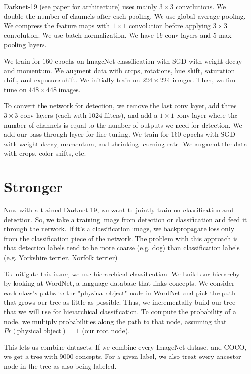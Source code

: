 \documentclass[a4paper]{article}
\begin{document}
Darknet-19 (see paper for architecture) uses mainly $3 \times 3$ convolutions.
We double the number of channels after each pooling. We use global average
pooling. We compress the feature maps with $1 \times 1$ convolution before
applying $3 \times 3$ convolution. We use batch normalization. We have 19 conv
layers and 5 max-pooling layers.

We train for 160 epochs on ImageNet classification with SGD with weight decay
and momentum. We augment data with crops, rotations, hue shift, saturation
shift, and exposure shift. We initially train on $224 \times 224$ images. Then,
we fine tune on $448 \times 448$ images.

To convert the network for detection, we remove the last conv layer, add three
$3 \times 3$ conv layers (each with 1024 filters), and add a $1 \times 1$
conv layer where the number of channels is equal to the number of outputs we
need for detection. We add our pass through layer for fine-tuning. We train for
160 epochs with SGD with weight decay, momentum, and shrinking learning rate.
We augment the data with crops, color shifts, etc.

\section{Stronger}
Now with a trained Darknet-19, we want to jointly train on classification and
detection. So, we take a training image from detection or classification and
feed it through the network. If it's a classification image, we backpropagate
loss only from the classification piece of the network. The problem with this
approach is that detection labels tend to be more coarse (e.g. dog) than
classification labels (e.g. Yorkshire terrier, Norfolk terrier).

To mitigate this issue, we use hierarchical classification. We build our
hierarchy by looking at WordNet, a language database that links concepts. We
consider each class's paths to the "physical object" node in WordNet and
pick the path that grows our tree as little as possible. Thus, we incrementally
build our tree that we will use for hierarchical classification. To compute
the probability of a node, we multiply probabilities along the path to that
node, assuming that $Pr(\textrm{physical object}) = 1$ (our root node).

This lets us combine datasets. If we combine every ImageNet dataset and COCO,
we get a tree with 9000 concepts. For a given label, we also treat every
ancestor node in the tree as also being labeled.
\end{document}
